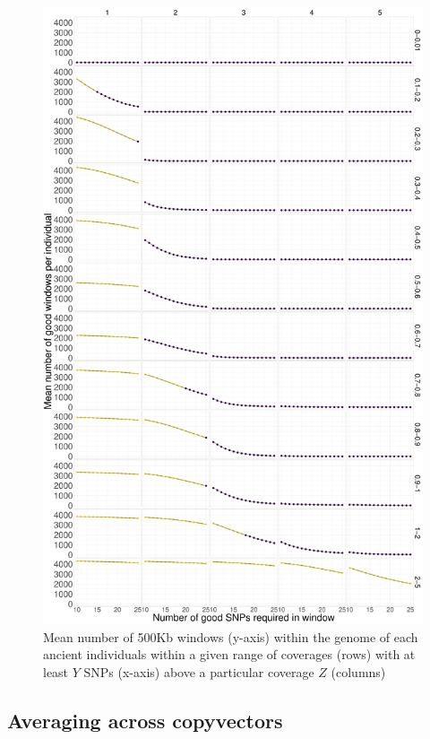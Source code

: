 \begin{figure}[htp]
    \centering
    \includegraphics[width=1.0\textwidth]{../images/chapter1/avg_good_windows.pdf}
    \caption{Mean number of 500Kb windows (y-axis) within the genome of each ancient individuals within a given range of coverages (rows) with at least $Y$ SNPs (x-axis) above a particular coverage $Z$ (columns)}
    \label{fig:avg_good_windows}
\end{figure}

\subsection{Averaging across copyvectors }

